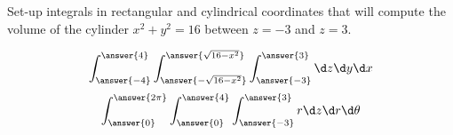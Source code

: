 \documentclass{ximera}
\author{Bart Snapp}
\begin{document}
\begin{exercise}
  Set-up integrals in rectangular and cylindrical coordinates that
  will compute the volume of the cylinder $x^2+y^2=16$ between $z=-3$
  and $z=3$.
  \begin{prompt}
  \[
  \int_{\answer{-4}}^{\answer{4}}\int_{\answer{-\sqrt{16-x^2}}}^{\answer{\sqrt{16-x^2}}}\int_{\answer{-3}}^{\answer{3}}\d z \d y \d x
  \]
  \[
  \int_{\answer{0}}^{\answer{2\pi}}\int_{\answer{0}}^{\answer{4}}\int_{\answer{-3}}^{\answer{3}}   r\d z \d r \d \theta
  \]
  \end{prompt}
\end{exercise}
\end{document}
